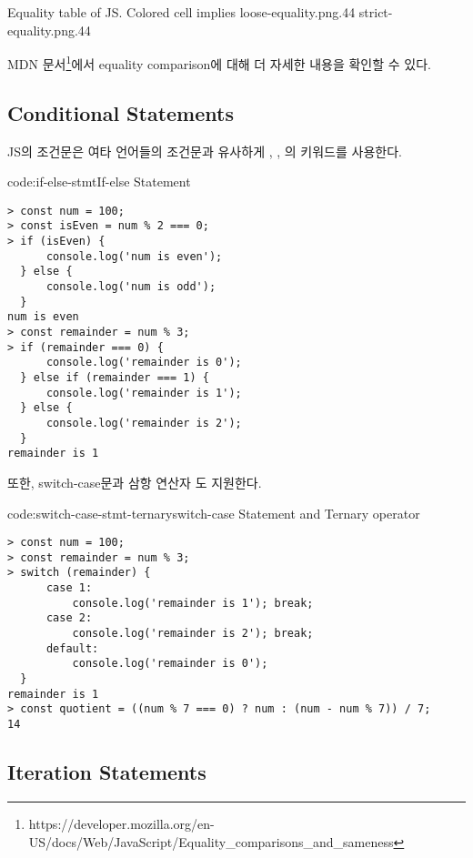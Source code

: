     {Equality table of JS. Colored cell implies \protect\footnotemark}{
        {loose-equality.png}{.44}
        {strict-equality.png}{.44}
}


MDN 문서\footnote{https://developer.mozilla.org/en-US/docs/Web/JavaScript/Equality\_comparisons\_and\_sameness}에서 equality comparison에 대해 더 자세한 내용을 확인할 수 있다.

\subsection*{Conditional Statements}

JS의 조건문은 여타 언어들의 조건문과 유사하게 , , 의 키워드를 사용한다.

\begin{codeenv}{code:if-else-stmt}{If-else Statement}\begin{verbatim}
> const num = 100;
> const isEven = num % 2 === 0;
> if (isEven) {
      console.log('num is even');
  } else {
      console.log('num is odd');
  }
num is even
> const remainder = num % 3;
> if (remainder === 0) {
      console.log('remainder is 0');
  } else if (remainder === 1) {
      console.log('remainder is 1');
  } else {
      console.log('remainder is 2');
  }
remainder is 1
\end{verbatim}
\end{codeenv}

또한, switch-case문과 삼항 연산자 도 지원한다.

\begin{codeenv}{code:switch-case-stmt-ternary}{switch-case Statement and Ternary operator}\begin{verbatim}
> const num = 100;
> const remainder = num % 3;
> switch (remainder) {
      case 1:
          console.log('remainder is 1'); break;
      case 2:
          console.log('remainder is 2'); break;
      default:
          console.log('remainder is 0');
  }
remainder is 1
> const quotient = ((num % 7 === 0) ? num : (num - num % 7)) / 7;
14
\end{verbatim}
\end{codeenv}

\subsection*{Iteration Statements}

